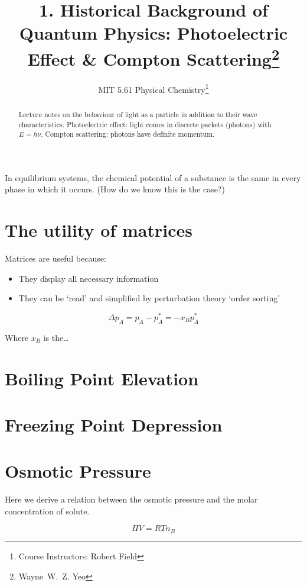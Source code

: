 \documentclass[a4paper]{tufte-handout}
\title{1. Historical Background of Quantum Physics: Photoelectric Effect \& Compton Scattering\thanks{Wayne~W.~Z. Yeo}}
\author[MIT 5.61]{\textnormal{MIT 5.61} Physical Chemistry\thanks{Course Instructors: Robert Field}}
\begin{document}
\maketitle %

\begin{abstract}
\noindent
Lecture notes on the behaviour of light as a particle in addition to their wave characteristics. Photoelectric effect: light
comes in discrete packets (photons) with $E = h \nu$. Compton scattering: photons have definite momentum.
\end{abstract}


In equilibrium systems, the chemical potential of a substance is the same in every phase in which it occurs.
(How do we know this is the case?)

\section*{The utility of matrices}
Matrices are useful because:

\begin{itemize}
  \item They display all necessary information
  \item They can be `read' and simplified by perturbation theory `order sorting'
\end{itemize}

$$\Delta p_A = p_A - p^{*}_{A} = -x_B p^*_A$$

Where $x_B$ is the\dots

\section*{Boiling Point Elevation}

\section*{Freezing Point Depression}

\section*{Osmotic Pressure}

Here we derive a relation between the osmotic pressure and the molar concentration of solute.

\begin{equation}
    \Pi V = RT n_B
\end{equation}
\end{document}
